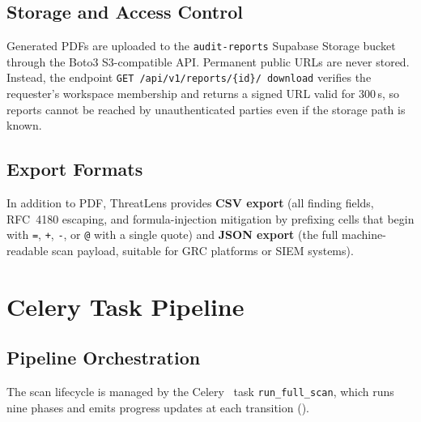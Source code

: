\documentclass[conference]{IEEEtran}
\begin{document}
\subsection{Storage and Access Control}
Generated PDFs are uploaded to the \texttt{audit-reports} Supabase Storage bucket
through the Boto3 S3-compatible API. Permanent public URLs are never stored.
Instead, the endpoint \texttt{GET /api/v1/reports/\allowbreak\{id\}/\allowbreak
download} verifies the requester's workspace membership and returns a signed URL
valid for 300\,s, so reports cannot be reached by unauthenticated parties even if
the storage path is known.

\subsection{Export Formats}
In addition to PDF, ThreatLens provides \textbf{CSV export} (all finding fields,
RFC~4180 escaping, and formula-injection mitigation by prefixing cells that begin
with \texttt{=}, \texttt{+}, \texttt{-}, or \texttt{@} with a single quote) and
\textbf{JSON export} (the full machine-readable scan payload, suitable for GRC
platforms or SIEM systems).

\section{Celery Task Pipeline}
\label{sec:task}

\subsection{Pipeline Orchestration}
The scan lifecycle is managed by the Celery~\cite{celery} task
\texttt{run\_full\_scan}, which runs nine phases and emits progress updates at
each transition ().
\end{document}
